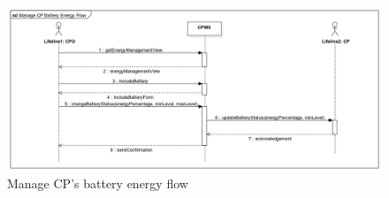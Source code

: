 \documentclass{Configuration_Files/PoliMi3i_thesis}
\begin{document}
\begin{figure}[H]
    \centering
    \includegraphics[width=1\textwidth]{Images/UseCases/ManageCPsBatteryEnergyFlow.jpg}
    \caption{Manage CP’s battery  energy flow}
\end{figure}

\end{document}

